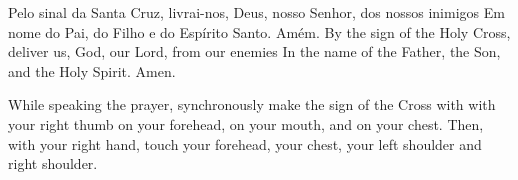  \beginverse
    Pelo sinal da Santa Cruz,
    livrai-nos, Deus, nosso Senhor,
    dos nossos inimigos
    \preceparspace
    Em nome do Pai,
    do Filho e
    do Espírito Santo.
    \preceparspace
    Amém.
  \endverse
  \beginverse\color{englishcolor}
    By the sign of the Holy Cross,
    deliver us, God, our Lord,
    from our enemies
    \preceparspace
    In the name of the Father,
    the Son, and
    the Holy Spirit.
    \preceparspace
    Amen.
  \endverse
  \begin{precenote}
    While speaking the prayer, synchronously make
    the sign of the Cross with with your right thumb
    on your forehead,
    on your mouth, and
    on your chest.
    \preceparspace
    Then, with your right hand, touch
    your forehead,
    your chest,
    your left shoulder and right shoulder.
  \end{precenote}
\endsong
